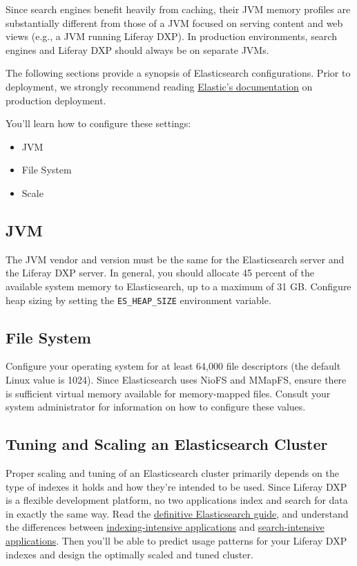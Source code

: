 Since search engines benefit heavily from caching, their JVM memory
profiles are substantially different from those of a JVM focused on
serving content and web views (e.g., a JVM running Liferay DXP). In
production environments, search engines and Liferay DXP should always be
on separate JVMs.

The following sections provide a synopsis of Elasticsearch
configurations. Prior to deployment, we strongly recommend reading
\href{https://www.elastic.co/guide/en/elasticsearch/guide/current/index.html}{Elastic's
documentation} on production deployment.

You'll learn how to configure these settings:

\begin{itemize}
\tightlist
\item
  JVM
\item
  File System
\item
  Scale
\end{itemize}

\subsection{JVM}\label{jvm}

The JVM vendor and version must be the same for the Elasticsearch server
and the Liferay DXP server. In general, you should allocate 45 percent
of the available system memory to Elasticsearch, up to a maximum of 31
GB. Configure heap sizing by setting the \texttt{ES\_HEAP\_SIZE}
environment variable.

\subsection{File System}\label{file-system}

Configure your operating system for at least 64,000 file descriptors
(the default Linux value is 1024). Since Elasticsearch uses NioFS and
MMapFS, ensure there is sufficient virtual memory available for
memory-mapped files. Consult your system administrator for information
on how to configure these values.

\subsection{Tuning and Scaling an Elasticsearch
Cluster}\label{tuning-and-scaling-an-elasticsearch-cluster}

Proper scaling and tuning of an Elasticsearch cluster primarily depends
on the type of indexes it holds and how they're intended to be used.
Since Liferay DXP is a flexible development platform, no two
applications index and search for data in exactly the same way. Read the
\href{https://www.elastic.co/guide/en/elasticsearch/guide/master/distributed-cluster.html}{definitive
Elasticsearch guide}, and understand the differences between
\href{https://www.elastic.co/guide/en/elasticsearch/reference/master/tune-for-indexing-speed.html}{indexing-intensive
applications} and
\href{https://www.elastic.co/guide/en/elasticsearch/reference/master/tune-for-search-speed.html}{search-intensive
applications}. Then you'll be able to predict usage patterns for your
Liferay DXP indexes and design the optimally scaled and tuned cluster.

